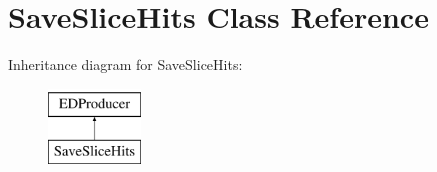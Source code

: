 \hypertarget{classSaveSliceHits}{}\section{Save\+Slice\+Hits Class Reference}
\label{classSaveSliceHits}
Inheritance diagram for Save\+Slice\+Hits\+:\begin{figure}[H]
\begin{center}
\leavevmode
\includegraphics[height=2.000000cm]{classSaveSliceHits}
\end{center}
\end{figure}
